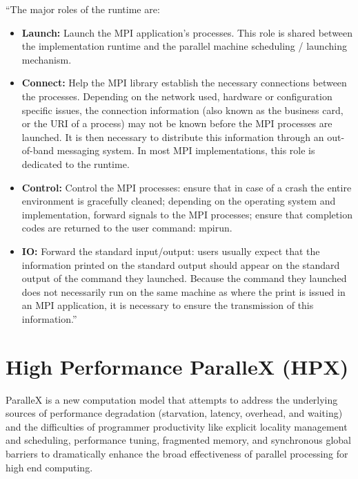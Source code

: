 ``The major roles of the runtime are:
\begin{itemize}
\item \textbf{Launch:} Launch the MPI application’s processes. This role is shared between the implementation runtime and the parallel machine scheduling / launching mechanism.
\item \textbf{Connect:} Help the MPI library establish the necessary connections between the processes. Depending on the network used, hardware or configuration specific issues, the connection information (also known as the business card, or the URI of
a process) may not be known before the MPI processes are launched. It is then necessary to distribute this information through an out-of-band messaging system. In most MPI implementations, this role is dedicated to the runtime.
\item \textbf{Control:} Control the MPI processes: ensure that in case of a crash the entire environment is gracefully cleaned; depending on the operating system and implementation, forward signals to the MPI processes; ensure that completion codes
are returned to the user command: mpirun.
\item \textbf{IO:} Forward the standard input/output: users usually expect that the information printed on the standard output should appear on the standard output of the command they launched. Because the command they launched does not necessarily run on the same machine as where the print is issued in an MPI application, it is necessary to ensure the transmission of this information.''~\cite{bosilca2011scalability}
\end{itemize}

\section{High Performance ParalleX (HPX)}
\label{sec:hpx}
ParalleX is a new computation model that attempts to address the underlying sources of performance degradation (starvation, latency, overhead, and waiting) and the difficulties of programmer productivity like explicit locality management and scheduling, performance tuning, fragmented memory, and synchronous global barriers to dramatically enhance the broad effectiveness of parallel processing for high end computing.~\cite{4228212}




